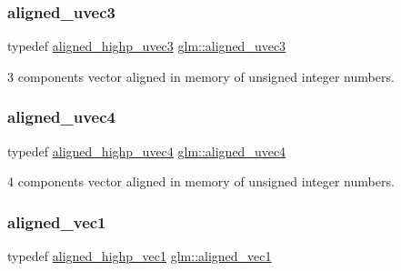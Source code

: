 \subsubsection{\texorpdfstring{aligned\+\_\+uvec3}{aligned\_uvec3}}
{\footnotesize\ttfamily typedef \hyperlink{group__gtc__type__aligned_ga1d303644825af6267389d6405f490ddc}{aligned\+\_\+highp\+\_\+uvec3} \hyperlink{group__gtc__type__aligned_ga5dee635ca69be0f5de5630a59d89034f}{glm\+::aligned\+\_\+uvec3}}



3 components vector aligned in memory of unsigned integer numbers. 

\mbox{\label{group__gtc__type__aligned_ga1e0792f3c64836e042ee3aad9bd8209c}} 
\subsubsection{\texorpdfstring{aligned\+\_\+uvec4}{aligned\_uvec4}}
{\footnotesize\ttfamily typedef \hyperlink{group__gtc__type__aligned_ga85553b476297f73c07bf3228ffb02d81}{aligned\+\_\+highp\+\_\+uvec4} \hyperlink{group__gtc__type__aligned_ga1e0792f3c64836e042ee3aad9bd8209c}{glm\+::aligned\+\_\+uvec4}}



4 components vector aligned in memory of unsigned integer numbers. 

\mbox{\label{group__gtc__type__aligned_ga8cf75c112dfa39264b7ef65c2ed6b3c4}} 
\subsubsection{\texorpdfstring{aligned\+\_\+vec1}{aligned\_vec1}}
{\footnotesize\ttfamily typedef \hyperlink{group__gtc__type__aligned_ga8da7535c1fe488b2b9a29c0c05e7b17e}{aligned\+\_\+highp\+\_\+vec1} \hyperlink{group__gtc__type__aligned_ga8cf75c112dfa39264b7ef65c2ed6b3c4}{glm\+::aligned\+\_\+vec1}}



